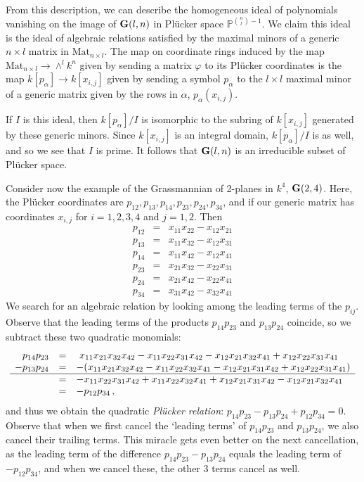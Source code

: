 \documentclass[12pt]{amsart}
\newcommand{\G}{{\bf G}}
\begin{document}
From this description, we can describe the homogeneous ideal of polynomials
vanishing on the image of $\G(l,n)$ in Pl\"ucker space 
${\mathbb P}^{\binom{n}{l}-1}$.
We claim this ideal is the ideal of algebraic relations satisfied by the
maximal minors of a generic $n\times l$ matrix in 
$\mbox{Mat}_{n\times l}$.
The map on coordinate rings induced by the map 
$\mbox{Mat}_{n\times l}\to \wedge^lk^n$
given by sending a matrix $\varphi$ to its Pl\"ucker coordinates 
is the map $k[p_\alpha]\to k[x_{i,j}]$ given by sending a symbol $p_\alpha$ 
to the $l\times l$ maximal minor of a generic matrix given by the rows in
$\alpha$, $p_\alpha(x_{i,j})$.

If $I$ is this ideal, then $k[p_\alpha]/I$ is isomorphic to the subring
of $k[x_{i,j}]$ generated by these generic minors.
Since $k[x_{i,j}]$ is an integral domain, $k[p_\alpha]/I$ is as well, and so
we see that $I$ is prime.
It follows that $\G(l,n)$ is an irreducible subset of Pl\"ucker space.
\medskip

Consider now the example of the Grassmannian of 2-planes in $k^4$, 
$\G(2,4)$.
Here, the Pl\"ucker coordinates are
$p_{12},p_{13},p_{14},p_{23},p_{24},p_{34}$, and if our generic matrix
has coordinates $x_{i,j}$ for $i=1,2,3,4$ and $j=1,2$.
Then
%
\begin{eqnarray*}
  p_{12}&=& x_{11}x_{22}-x_{12}x_{21}\\
  p_{13}&=& x_{11}x_{32}-x_{12}x_{31}\\
  p_{14}&=& x_{11}x_{42}-x_{12}x_{41}\\
  p_{23}&=& x_{21}x_{32}-x_{22}x_{31}\\
  p_{24}&=& x_{21}x_{42}-x_{22}x_{41}\\
  p_{34}&=& x_{31}x_{42}-x_{32}x_{41}
\end{eqnarray*}
%
We search for an algebraic relation by looking among the leading terms of
the $p_{ij}$.
Observe that the leading terms of the products $p_{14}p_{23}$ and
$p_{13}p_{24}$ coincide, so we subtract these two quadratic monomials:
$$
\begin{array}{rcl}
p_{14}p_{23} &=&\ x_{11}x_{21}x_{32}x_{42} - x_{11}x_{22}x_{31}x_{42}
               -x_{12}x_{21}x_{32}x_{41} + x_{12}x_{22}x_{31}x_{41}\\
-p_{13}p_{24}&=&-(x_{11}x_{21}x_{32}x_{42} - x_{11}x_{22}x_{32}x_{41}
                 -x_{12}x_{21}x_{31}x_{42} + x_{12}x_{22}x_{31}x_{41})
            \\\hline
             &=&-x_{11}x_{22}x_{31}x_{42} + x_{11}x_{22}x_{32}x_{41}
                +x_{12}x_{21}x_{31}x_{42} - x_{12}x_{21}x_{32}x_{41}\\
             &=& -p_{12}p_{34}\,,
\end{array}
$$
and thus we obtain the quadratic {\sl Pl\"ucker relation}:
$p_{14}p_{23}-p_{13}p_{24}+p_{12}p_{34}=0$.
Observe that when we first cancel the `leading terms' of $p_{14}p_{23}$ and
$p_{13}p_{24}$, we also cancel their trailing terms.
This miracle gets even better on the next cancellation, as the leading term
of the difference $p_{14}p_{23}-p_{13}p_{24}$ equals the leading term of
$-p_{12}p_{34}$, and when we cancel these, the other 3 terms cancel as well.
\end{document}
